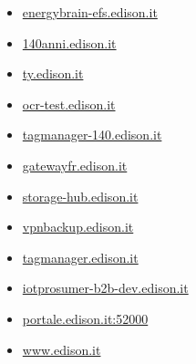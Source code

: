 \documentclass{article}
\begin{document}
\begin{itemize}
        
        
        \item \href{ http://energybrain-efs.edison.it/ }{ energybrain-efs.edison.it }
    
        
        
        \item \href{ https://140anni.edison.it/ }{ 140anni.edison.it }
    
        
        
        \item \href{ https://ty.edison.it/ }{ ty.edison.it }
    
        
        
        \item \href{ http://ocr-test.edison.it/ }{ ocr-test.edison.it }
    
        
        
        \item \href{ http://tagmanager-140.edison.it/ }{ tagmanager-140.edison.it }
    
        
        
        \item \href{ http://gatewayfr.edison.it/ }{ gatewayfr.edison.it }
    
        
        
        \item \href{ http://storage-hub.edison.it/ }{ storage-hub.edison.it }
    
        
        
        \item \href{ http://vpnbackup.edison.it/ }{ vpnbackup.edison.it }
    
        
        
        \item \href{ http://tagmanager.edison.it/ }{ tagmanager.edison.it }
    
        
        
        \item \href{ http://iotprosumer-b2b-dev.edison.it/ }{ iotprosumer-b2b-dev.edison.it }
    
        
        
        \item \href{ https://portale.edison.it:52000/irj/portal }{ portale.edison.it:52000 }
    
        
        
        \item \href{ https://www.edison.it/it }{ www.edison.it }
    

\end{itemize}
\end{document}
